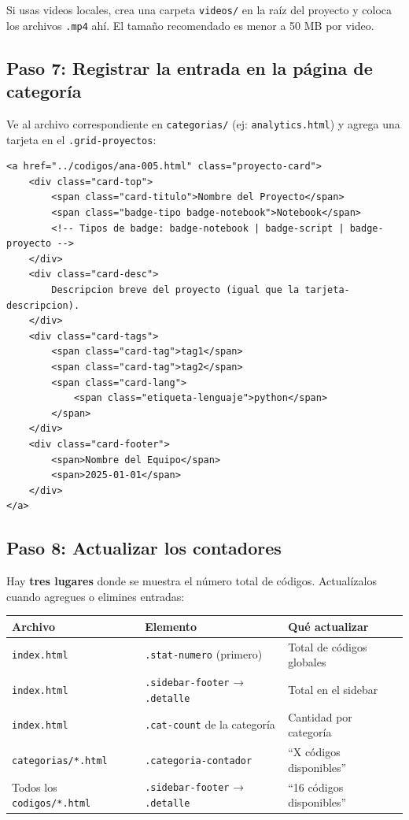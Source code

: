 \documentclass[12pt, a4paper]{article}
\newcommand{\archivo}[1]{\texttt{\textcolor{cpAccent}{#1}}}
\newcommand{\clase}[1]{\texttt{\textcolor{cpAzul}{.#1}}}
\begin{document}
\begin{cajaAviso}
    Si usas videos locales, crea una carpeta \archivo{videos/} en la raíz
    del proyecto y coloca los archivos \texttt{.mp4} ahí. El tamaño
    recomendado es menor a 50 MB por video.
\end{cajaAviso}

\subsection{Paso 7: Registrar la entrada en la página de categoría}

Ve al archivo correspondiente en \archivo{categorias/} (ej: \archivo{analytics.html})
y agrega una tarjeta en el \clase{grid-proyectos}:

\begin{lstlisting}[style=htmlstyle, caption={Agregar tarjeta en página de categoría}]
<a href="../codigos/ana-005.html" class="proyecto-card">
    <div class="card-top">
        <span class="card-titulo">Nombre del Proyecto</span>
        <span class="badge-tipo badge-notebook">Notebook</span>
        <!-- Tipos de badge: badge-notebook | badge-script | badge-proyecto -->
    </div>
    <div class="card-desc">
        Descripcion breve del proyecto (igual que la tarjeta-descripcion).
    </div>
    <div class="card-tags">
        <span class="card-tag">tag1</span>
        <span class="card-tag">tag2</span>
        <span class="card-lang">
            <span class="etiqueta-lenguaje">python</span>
        </span>
    </div>
    <div class="card-footer">
        <span>Nombre del Equipo</span>
        <span>2025-01-01</span>
    </div>
</a>
\end{lstlisting}

\subsection{Paso 8: Actualizar los contadores}

Hay \textbf{tres lugares} donde se muestra el número total de códigos.
Actualízalos cuando agregues o elimines entradas:

\begin{center}
\begin{tabular}{lll}
\toprule
\textbf{Archivo} & \textbf{Elemento} & \textbf{Qué actualizar} \\
\midrule
\archivo{index.html}       & \clase{stat-numero} (primero)       & Total de códigos globales \\
\archivo{index.html}       & \clase{sidebar-footer} → \clase{detalle} & Total en el sidebar \\
\archivo{index.html}       & \clase{cat-count} de la categoría   & Cantidad por categoría \\
\archivo{categorias/*.html} & \clase{categoria-contador}          & ``X códigos disponibles'' \\
Todos los \archivo{codigos/*.html} & \clase{sidebar-footer} → \clase{detalle} & ``16 códigos disponibles'' \\
\bottomrule
\end{tabular}
\end{center}
\end{document}
